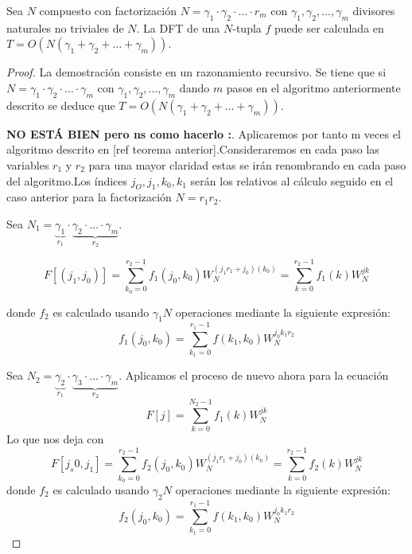 \begin{teorema}
Sea $N$ compuesto con factorización $N = \gamma_1 \cdot \gamma_2 \cdot \ldots \cdot r_m$ con $\gamma_1, \gamma_2, \ldots, \gamma_m$ divisores naturales no triviales de $N$.
La DFT de una $N$-tupla $f$ puede ser calculada en $T = O(N(\gamma_1 + \gamma_2 + \ldots + \gamma_m))$.
\end{teorema}

\begin{proof}

La demostración consiste en un razonamiento recursivo. Se tiene que si $N = \gamma_1 \cdot \gamma_2 \cdot \ldots \cdot \gamma_m$ con $\gamma_1, \gamma_2, \ldots, \gamma_m$ dando $m$ pasos en el algoritmo anteriormente descrito se deduce que  $T=O(N(\gamma_1 + \gamma_2 + \ldots + \gamma_m))$.

\textbf{NO ESTÁ BIEN pero ns como hacerlo :}.
Aplicaremos por tanto m veces el algoritmo descrito en [ref teorema anterior].Consideraremos en cada paso las variables $r_1$ y $r_2$ para una mayor claridad estas se irán renombrando en cada paso del algoritmo.Los índices $j_O,j_1,k_0,k_1$ serán los relativos al cálculo seguido en el caso anterior para la  factorización $N= r_1r_2$.

\vspace{0.1cm}

Sea  $ N_1 =  \underbrace{\gamma_1}_{r_1} \cdot \underbrace{\gamma_2 \cdot \ldots \cdot \gamma_m}_{r_2}$.

\begin{equation}
    F[(j_1,j_0)] = \sum_{k_0=0}^{r_2-1}  f_1(j_0,k_0)W_N^{(j_1r_1+j_0)(k_0)} = \sum_{k=0}^{r_2-1}  f_1(k)W_N^{jk} 
\end{equation}

donde $f_2$ es calculado usando $\gamma_1N$ operaciones mediante la siguiente expresión:
\begin{equation}
    f_1(j_0,k_0) = \sum_{k_1=0}^{r_1-1} f(k_1,k_0) W_N^{j_0k_1r_2}
\end{equation}
\vspace{0.1cm}
 
\vspace{0.1cm}

Sea $N_2 = \underbrace{\gamma_2}_{r_1} \cdot \underbrace{ \gamma_3 \cdot \ldots \cdot \gamma_m}_{r_2}$.
Aplicamos el proceso de nuevo ahora para la ecuación 
\begin{equation}\label{eq:fft2}
    F[j] = \sum_{k=0}^{N_2-1}  f_1(k)W_N^{jk}  
\end{equation}
Lo que nos deja con 
\begin{equation}\label{eq:fft2}
      F[j_s0,j_1]  = \sum_{k_0=0}^{r_2-1}  f_2(j_0,k_0)W_N^{(j_1r_1+j_0)(k_0)} = \sum_{k=0}^{r_2-1}  f_2(k)W_N^{jk} 
\end{equation}
donde $f_2$ es calculado usando $\gamma_2N$ operaciones mediante la siguiente expresión:
\begin{equation}\label{eq:fft1}
    f_2(j_0,k_0) = \sum_{k_1=0}^{r_1-1} f(k_1,k_0) W_N^{j_0k_1r_2}
\end{equation}



\end{proof}
